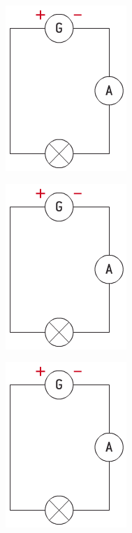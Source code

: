 \documentclass[12pt,a4paper]{article}
\begin{document}
	
	



		
		\begin{multicols}{3}
			
			\begin{center}
				\includegraphics[scale=0.6]{img/schema1}
			\end{center}
			
			\begin{center}
				\includegraphics[scale=0.6]{img/schema1}
			\end{center}
		
			\begin{center}
				\includegraphics[scale=0.6]{img/schema1}
			\end{center}
		

\end{multicols}
\end{document}
